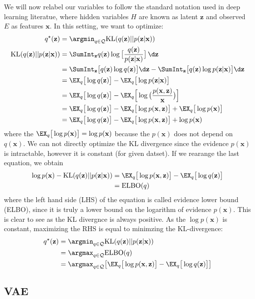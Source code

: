 We will now relabel our variables to follow
the standard notation used in deep learning literatue, where hidden variables $H$ are known as latent $\mathbf{z}$ and observed $E$ as features $\mathbf{x}$. 
In this setting, we want to optimize:
\begin{align}
    q^\star(\mathbf{z}) &= \argmin_{q \in \mathcal{Q}} \mathrm{KL}(q(\mathbf{z}) || p(\mathbf{z} | \mathbf{x})) \\
    \mathrm{KL}(q(\mathbf{z}) || p(\mathbf{z} | \mathbf{x})) &= \SumInt_\mathbf{z} q(\mathbf{z}) \log \big[ \frac{q(\mathbf{z})}{p(\mathbf{z}|\mathbf{x})} \big]\,\d \mathbf{z} \\
    &= \SumInt_\mathbf{z} \big[q(\mathbf{z}) \log q(\mathbf{z})\big] \d \mathbf{z} - \SumInt_\mathbf{z}  \big[q(\mathbf{z}) \log p(\mathbf{z}|\mathbf{x})\big] \d \mathbf{z} \\
    &= \EX_q \big[\log q(\mathbf{z})\big] - \EX_q \big[\log p(\mathbf{z}|\mathbf{x})\big] \\
    &= \EX_q \big[\log q(\mathbf{z})\big] - \EX_q \Big[\log \big( \frac{p(\mathbf{x},\mathbf{z})}{\mathbf{x}}\big) \Big] \\
    &= \EX_q \big[\log q(\mathbf{z})\big] - \EX_q \big[\log p(\mathbf{x},\mathbf{z})\big] + \EX_q \big[\log p(\mathbf{x})\big] \\
    &= \EX_q \big[\log q(\mathbf{z})\big] - \EX_q \big[\log p(\mathbf{x},\mathbf{z})\big] + \log p(\mathbf{x})
\end{align}
where the $\EX_q \big[\log p(\mathbf{x})\big] = \log p(\mathbf{x})$ because the $p(\mathbf{x})$ does not depend on $q(\mathbf{x})$. 
We can not directly optimize the KL divergence since the evidence $p(\mathbf{x})$ is intractable, however it is constant (for given datset).
If we rearange the last equation, we obtain 
\begin{align}
\log p(\mathbf{x}) - \mathrm{KL}(q(\mathbf{z}) || p(\mathbf{z} | \mathbf{x})) &= \EX_q \big[\log p(\mathbf{x},\mathbf{z})\big] - \EX_q \big[\log q(\mathbf{z})\big] \\
    &= \mathrm{ELBO}(q)
\end{align}
where the left hand side (LHS) of the equation is called evidence lower bound (ELBO), since it is truly a lower bound on the logarithm of evidence $p(\mathbf{x})$. This is clear to see 
as the KL divergnce is always positive. As the $\log p(\mathbf{x})$ is constant, maximizing the RHS is equal to minimzing the KL-divergence:
\begin{align*} 
    q^\star(\mathbf{z}) &= \argmin_{q \in \mathcal{Q}} \mathrm{KL}(q(\mathbf{z}) || p(\mathbf{z} | \mathbf{x})) \\
                        &= \argmax_{q \in \mathcal{Q}} \mathrm{ELBO}(q) \\
                        &= \argmax_{q \in \mathcal{Q}} \bigl[ \EX_q \big[\log p(\mathbf{x},\mathbf{z})\big] - \EX_q \big[\log q(\mathbf{z})\big] \bigr]  \\
\end{align*}
\subsection{VAE}
\label{subsec:vaes}

